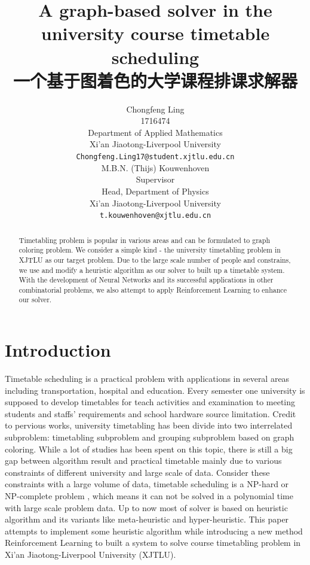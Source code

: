 \documentclass{article}
\title{A graph-based solver in the university course timetable scheduling\\
一个基于图着色的大学课程排课求解器}
\author{ \hspace{1mm}Chongfeng Ling \\
	1716474\\
	Department of Applied Mathematics\\
	Xi'an Jiaotong-Liverpool University\\
	\texttt{Chongfeng.Ling17@student.xjtlu.edu.cn} \\
	\And
	M.B.N. (Thijs) Kouwenhoven \\
	Supervisor \\
	Head, Department of Physics \\
	Xi'an Jiaotong-Liverpool University\\
	\texttt{t.kouwenhoven@xjtlu.edu.cn} \\
}
\begin{document}
\maketitle



\newpage
\tableofcontents
\newpage

\begin{abstract}
	Timetabling problem is popular in various areas and can be formulated to graph coloring problem. We consider a simple kind - the university timetabling problem in XJTLU as our target problem. Due to the large scale number of people and constrains, we use and modify a heuristic algorithm as our solver to built up a timetable system. With the development of Neural Networks and its successful applications in other combinatorial problems, we also attempt to apply Reinforcement Learning to enhance our solver. 
\end{abstract}

\newpage

\section{Introduction}

Timetable scheduling is a practical problem with applications in several areas including transportation, hospital and education. Every semester one university is supposed to develop timetables for teach activities and examination to meeting students and staffs' requirements and school hardware source limitation. Credit to pervious works, university timetabling has been divide into two interrelated subproblem: timetabling subproblem and grouping subproblem based on graph coloring\citep{(hertz1991)tabu}. While a lot of studies has been spent on this topic, there is still a big gap between algorithm result and practical timetable \citep{(mccollum2006)perspective} mainly due to various constraints of different university and large scale of data. Consider these constraints with a large volume of data, timetable scheduling is a NP-hard or NP-complete problem \citep{(even1975)complexity}, which means it can not be solved in a polynomial time with large scale problem data. Up to now most of solver is based on heuristic algorithm and its variants like meta-heuristic and hyper-heuristic. This paper attempts to implement some heuristic algorithm while introducing a new method Reinforcement Learning to built a system to solve course timetabling problem in Xi'an Jiaotong-Liverpool University (XJTLU).
\end{document}
